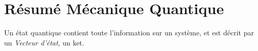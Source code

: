 \section*{Résumé Mécanique Quantique}
Un état quantique contient toute l'information sur un système, et est décrit par un
\textit{Vecteur d'état}, un ket.
